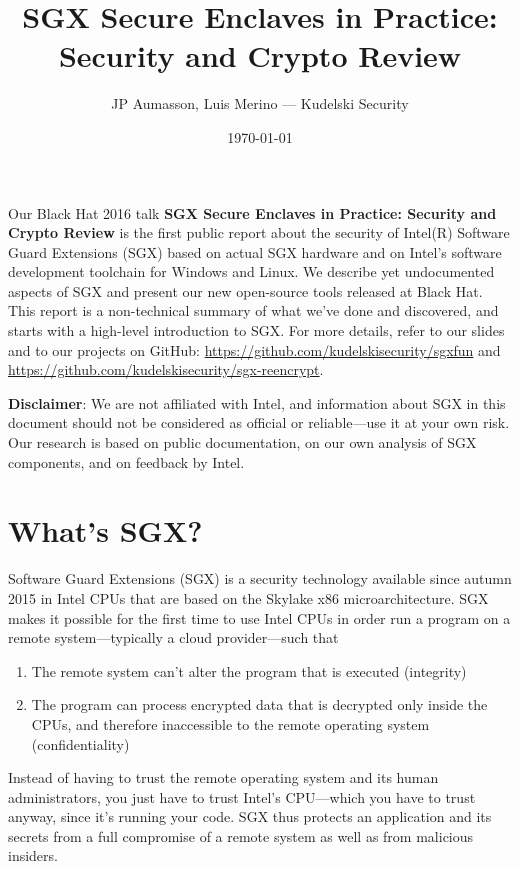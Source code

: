 \documentclass[]{article}
\title{SGX Secure Enclaves in Practice:\\ Security and Crypto Review}
\author{JP Aumasson, Luis Merino --- Kudelski Security}
\date{\today}
\begin{document}
\maketitle

Our Black Hat 2016 talk \textbf{SGX Secure Enclaves in Practice:
Security and Crypto Review} is the first public report about the
security of Intel(R) Software Guard Extensions (SGX) based on actual SGX
hardware and on Intel's software development toolchain for Windows and
Linux. We describe yet undocumented aspects of SGX and present our new
open-source tools released at Black Hat. This report is a non-technical
summary of what we've done and discovered, and starts with a high-level
introduction to SGX. For more details, refer to our slides and to our
projects on GitHub: \url{https://github.com/kudelskisecurity/sgxfun} and
\url{https://github.com/kudelskisecurity/sgx-reencrypt}.

\textbf{Disclaimer}: We are not affiliated with Intel, and information
about SGX in this document should not be considered as official or
reliable---use it at your own risk. Our research is based on public
documentation, on our own analysis of SGX components, and on feedback by
Intel.

\section{What's SGX?}\label{whats-sgx}

Software Guard Extensions (SGX) is a security technology available since
autumn 2015 in Intel CPUs that are based on the Skylake x86
microarchitecture. SGX makes it possible for the first time to use Intel
CPUs in order run a program on a remote system---typically a cloud
provider---such that

\begin{enumerate}
\def\labelenumi{\arabic{enumi}.}
\item
  The remote system can't alter the program that is executed (integrity)
\item
  The program can process encrypted data that is decrypted only inside
  the CPUs, and therefore inaccessible to the remote operating system
  (confidentiality)
\end{enumerate}

Instead of having to trust the remote operating system and its human
administrators, you just have to trust Intel's CPU---which you have to
trust anyway, since it's running your code. SGX thus protects an
application and its secrets from a full compromise of a remote system as
well as from malicious insiders.
\end{document}
